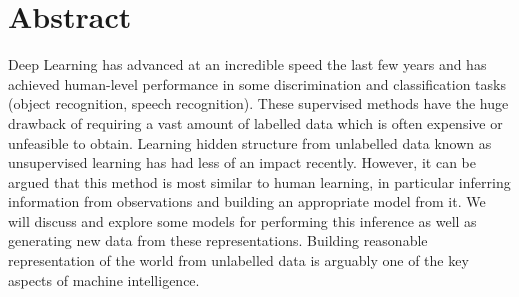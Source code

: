 \section{Abstract}
\label{sec:abstract}
Deep Learning has advanced at an incredible speed the last few years and has achieved human-level performance in some discrimination and classification tasks (object recognition, speech recognition).
These supervised methods have the huge drawback of requiring a vast amount of labelled data which is often expensive or unfeasible to obtain.
Learning hidden structure from unlabelled data known as unsupervised learning has had less of an impact recently.
However, it can be argued that this method is most similar to human learning, in particular inferring information from observations and building an appropriate model from it.
We will discuss and explore some models for performing this inference as well as generating new data from these representations.
Building reasonable representation of the world from unlabelled data is arguably one of the key aspects of machine intelligence.





